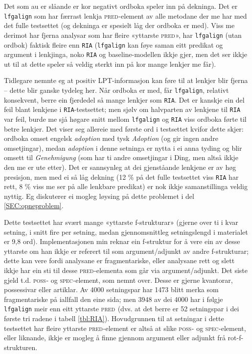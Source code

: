 \documentclass[12pt,a4paper,oneside,draft]{report}
\newcommand{\F}[2]{\textsc{#1}\ensuremath{_{#2}}}
\newcommand{\SPEC}{\F{spec}{}}
\newcommand{\POSS}{\F{poss}{}}
\newcommand{\PRED}{\F{pred}{}}
\begin{document}
Det som au er slåande er kor negativt ordboka speler inn på dekninga.
 Det er \texttt{lfgalign} som har færrast lenkja \PRED{}-element av alle
 metodane der me har med det fulle testsettet (og dekninga er spesielt
 låg der ordboka er med). Viss me derimot har fjerna analysar som har
 fleire «yttarste \PRED{}», har \texttt{lfgalign} (utan ordbok) faktisk
 fleire enn \texttt{RIA} (\texttt{lfgalign} kan føye saman eitt predikat og argument
 i lenkjinga, noko \texttt{RIA} og baseline-modellen ikkje gjer, men det ser
 ikkje ut til at dette speler så veldig sterkt inn på kor mange
 lenkjer me får).

Tidlegare nemnte eg at positiv LPT-informasjon kan føre til at lenkjer
 blir fjerna -- dette blir ganske tydeleg her. Når ordboka er med, får
 \texttt{lfgalign}, relativt konsekvent, berre ein fjerdedel så mange lenkjer
 som \texttt{RIA}.  Det er kanskje ein del feil blant lenkjene i
 \texttt{RIA}-testsettet; men sjølv om halvparten av lenkjene til \texttt{RIA} var
 feil, burde me sjå høgare snitt mellom \texttt{lfgalign} og \texttt{RIA} viss
 ordboka førte til betre lenkjer. Det viser seg allereie med første
 ord i testsettet kvifor dette skjer: ordboka omset engelsk \emph{adoption}
 med tysk \emph{Adoption} (og gir ingen andre omsetjingar), medan
 \emph{adoption} i denne setninga er nytta i ei anna tyding og blir omsett
 til \emph{Genehmigung} (som har ti andre omsetjingar i Ding, men altså
 ikkje den me er ute etter).  Det er sannsynleg at dei gjenståande
 lenkjene er av høg presisjon, men med ei så låg dekning (12 \% på det
 fulle testsettet viss \texttt{RIA} har rett, 8 \% viss me ser på alle
 lenkbare predikat) er nok ikkje samanstillinga veldig nyttig. Eg
 diskuterer ei mogleg løysing på dette problemet i del
 \ref{SEC:opneproblem}.

Dette testsettet har svært mange «yttarste f-strukturar» (gjerne over
 ti i kvar setning, i snitt fire per setning, medan gjennomsnittleg
 setningslengd i materialet er 9,8 ord). Implementasjonen min reknar
 ein f-struktur for å vere ein av desse yttarste om han ikkje er
 referert til som argument/adjunkt av andre f-strukturar; dette kan
 vere fordi analysane er fragmentariske, eller analysane rett og slett
 ikkje har ein sti til desse \PRED{}-elementa som går via
 argument/adjunkt. Det siste gjeld t.d.  \POSS{}- og \SPEC{}-element,
 som nemnt over. Desse er gjerne kvantorar, possessivar eller
 artiklar. Av 4000 setningspar har 1473 blitt merka som fragmentariske
 på iallfall den eine sida; men 3948 av dei 4000 har i følgje
 \texttt{lfgalign} meir enn eitt yttarste \PRED{} (dvs. at det berre er 52
 setningspar i dei første tri radene i tabell
 \ref{tbl:RIA}). Hovudgrunnen til at setningar i dette testsettet har
 fleire yttarste \PRED{}-element er altså at slike \POSS{}- og
 \SPEC{}-element, eller liknande, ikkje er mogleg å finne gjennom
 argument eller adjunkt frå rot-f-strukturen.
\end{document}
